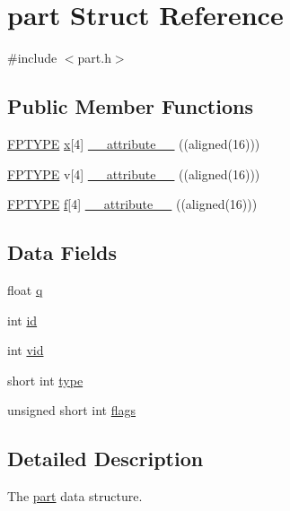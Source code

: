 \hypertarget{structpart}{\section{part Struct Reference}
\label{structpart}
}


{\ttfamily \#include $<$part.\-h$>$}

\subsection*{Public Member Functions}
\begin{DoxyCompactItemize}
\item 
\hyperlink{fptype_8h_a78f09a67f3e652a3b25e085a0082a835}{F\-P\-T\-Y\-P\-E} \hyperlink{potential__eval_8h_a83e62476eec76311df9cccc0496c8e95}{x}\mbox{[}4\mbox{]} \hyperlink{structpart_a87aab6d36389c356cbb9384b409fd9ea}{\-\_\-\-\_\-attribute\-\_\-\-\_\-} ((aligned(16)))
\item 
\hyperlink{fptype_8h_a78f09a67f3e652a3b25e085a0082a835}{F\-P\-T\-Y\-P\-E} v\mbox{[}4\mbox{]} \hyperlink{structpart_abaa61ca0d3ab51f683575172564ad9a9}{\-\_\-\-\_\-attribute\-\_\-\-\_\-} ((aligned(16)))
\item 
\hyperlink{fptype_8h_a78f09a67f3e652a3b25e085a0082a835}{F\-P\-T\-Y\-P\-E} \hyperlink{potential__eval_8h_a1f01162d8c9ffd5a2c09c3c61cc8ef43}{f}\mbox{[}4\mbox{]} \hyperlink{structpart_a032cde3937a4f6f3ba5283dd3021dccc}{\-\_\-\-\_\-attribute\-\_\-\-\_\-} ((aligned(16)))
\end{DoxyCompactItemize}
\subsection*{Data Fields}
\begin{DoxyCompactItemize}
\item 
float \hyperlink{structpart_a0a19a0620af7373e3ddba0ce4e1058e1}{q}
\item 
int \hyperlink{structpart_a7441ef0865bcb3db9b8064dd7375c1ea}{id}
\item 
int \hyperlink{structpart_af1cae64e47ec410dab67cb572e4acd36}{vid}
\item 
short int \hyperlink{structpart_aaa8ba4297d83f2cce5af75b18564ae13}{type}
\item 
unsigned short int \hyperlink{structpart_ae718cba7f740adbac78a900ce25b73af}{flags}
\end{DoxyCompactItemize}


\subsection{Detailed Description}
The \hyperlink{structpart}{part} data structure.

